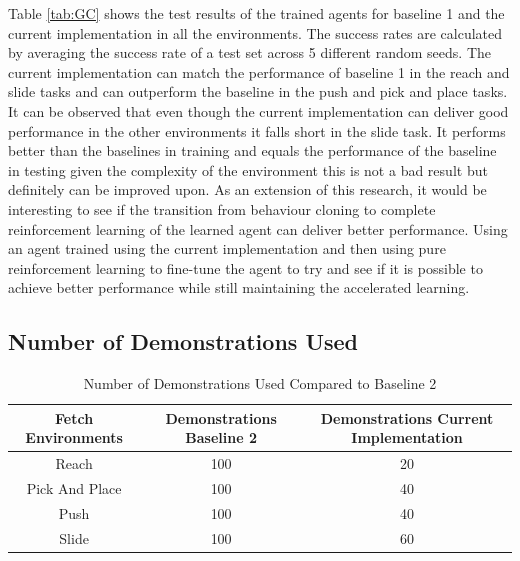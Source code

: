 Table \ref{tab:GC} shows the test results of the trained agents for baseline 1 and the current implementation in all the environments. The success rates are calculated by averaging the success rate of a test set across 5 different random seeds. The current implementation can match the performance of baseline 1 in the reach and slide tasks and can outperform the baseline in the push and pick and place tasks. It can be observed that even though the current implementation can deliver good performance in the other environments it falls short in the slide task. It performs better than the baselines in training and equals the performance of the baseline in testing given the complexity of the environment this is not a bad result but definitely can be improved upon. As an extension of this research, it would be interesting to see if the transition from behaviour cloning to complete reinforcement learning of the learned agent can deliver better performance. Using an agent trained using the current implementation and then using pure reinforcement learning to fine-tune the agent to try and see if it is possible to achieve better performance while still maintaining the accelerated learning. \\

\subsection{Number of Demonstrations Used}

\begin{table}[h!]
\centering
\begin{tabular}{|c|c|c|}
\hline
Fetch Environments & Demonstrations Baseline 2 & Demonstrations Current Implementation \\ \hline
Reach              & 100                     & 20                                    \\ \hline
Pick And Place     & 100                     & 40                                    \\ \hline
Push               & 100                     & 40                                    \\ \hline
Slide              & 100                     & 60                                    \\ \hline
\end{tabular}
\caption{Number of Demonstrations Used Compared to Baseline 2}
\label{tab:ND}
\end{table}

